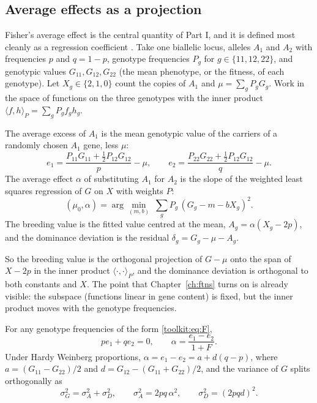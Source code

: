 \subsection{Average effects as a projection}\label{toolkit:sec:avg}

Fisher's average effect is the central quantity of Part I, and it is defined most cleanly as a
regression coefficient \citep{toolkit:fisher1918,toolkit:fisher1941}. Take one biallelic locus,
alleles $A_1$ and $A_2$ with frequencies $p$ and $q=1-p$, genotype frequencies $P_g$ for
$g\in\{11,12,22\}$, and genotypic values $G_{11},G_{12},G_{22}$ (the mean phenotype, or the
fitness, of each genotype). Let $X_g\in\{2,1,0\}$ count the copies of $A_1$ and
$\mu=\sum_gP_gG_g$. Work in the space of functions on the three genotypes with the inner product
$\langle f,h\rangle_P=\sum_gP_gf_gh_g$.

\begin{definition}\label{toolkit:def:avg}
The average excess of $A_1$ is the mean genotypic value of the carriers of a randomly chosen
$A_1$ gene, less $\mu$:
\[
e_1=\frac{P_{11}G_{11}+\tfrac12P_{12}G_{12}}{p}-\mu,\qquad
e_2=\frac{P_{22}G_{22}+\tfrac12P_{12}G_{12}}{q}-\mu .
\]
The average effect $\alpha$ of substituting $A_1$ for $A_2$ is the slope of the weighted least
squares regression of $G$ on $X$ with weights $P$:
\[
(\mu_0,\alpha)=\arg\min_{(m,b)}\;\sum_gP_g\,(G_g-m-bX_g)^2 .
\]
The breeding value is the fitted value centred at the mean, $A_g=\alpha(X_g-2p)$, and the
dominance deviation is the residual $\delta_g=G_g-\mu-A_g$.
\end{definition}

So the breeding value is the orthogonal projection of $G-\mu$ onto the span of $X-2p$ in the
inner product $\langle\cdot,\cdot\rangle_P$, and the dominance deviation is orthogonal to both
constants and $X$. The point that Chapter~\ref{ch:ftns} turns on is already visible: the
subspace (functions linear in gene content) is fixed, but the inner product moves with the
genotype frequencies.

\begin{theorem}\label{toolkit:thm:avg}
For any genotype frequencies of the form \eqref{toolkit:eq:F},
\begin{equation}\label{toolkit:eq:alphaF}
pe_1+qe_2=0,\qquad \alpha=\frac{e_1-e_2}{1+F}.
\end{equation}
Under Hardy Weinberg proportions, $\alpha=e_1-e_2=a+d(q-p)$, where $a=(G_{11}-G_{22})/2$ and
$d=G_{12}-(G_{11}+G_{22})/2$, and the variance of $G$ splits orthogonally as
\begin{equation}\label{toolkit:eq:vardecomp}
\sigma^2_G=\sigma^2_A+\sigma^2_D,\qquad \sigma^2_A=2pq\,\alpha^2,\qquad \sigma^2_D=(2pqd)^2 .
\end{equation}
\end{theorem}

